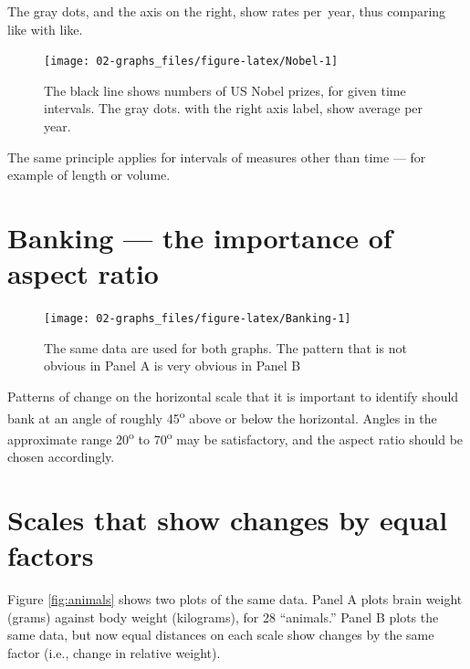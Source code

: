 \documentclass[
  10pt,
  b5paper]{book}
\begin{document}
The gray dots, and the axis on the right, show rates per~year,
thus comparing like with like.

\begin{figure}[H]

{\centering \texttt{[image: 02-graphs\_files/figure-latex/Nobel-1]} 

}

\caption{The black line shows numbers of US Nobel prizes, for given time intervals. The gray dots. with the right axis label, show average per year.}\label{fig:Nobel}
\end{figure}

The same principle applies for intervals of measures
other than time --- for example of length or volume.

\hypertarget{banking-the-importance-of-aspect-ratio}{%
\section{Banking --- the importance of aspect ratio}\label{banking-the-importance-of-aspect-ratio}}

\begin{figure}[H]

{\centering \texttt{[image: 02-graphs\_files/figure-latex/Banking-1]} 

}

\caption{The same data are used for both graphs.  The pattern that is not
obvious in Panel A is very obvious in Panel B}\label{fig:Banking}
\end{figure}

Patterns of change on the horizontal scale that it is
important to identify should bank at an angle of roughly 45\textsuperscript{o}
above or below the horizontal. Angles in
the approximate range 20\textsuperscript{o} to 70\textsuperscript{o} may be satisfactory,
and the aspect ratio should be chosen accordingly.

\hypertarget{scales-that-show-changes-by-equal-factors}{%
\section{Scales that show changes by equal factors}\label{scales-that-show-changes-by-equal-factors}}

Figure \ref{fig:animals} shows two plots of the same data.
Panel A plots brain weight (grams) against body weight (kilograms),
for 28 ``animals.'' Panel B plots the same data, but now equal distances
on each scale show changes by the same factor (i.e., change in relative
weight).
\end{document}
